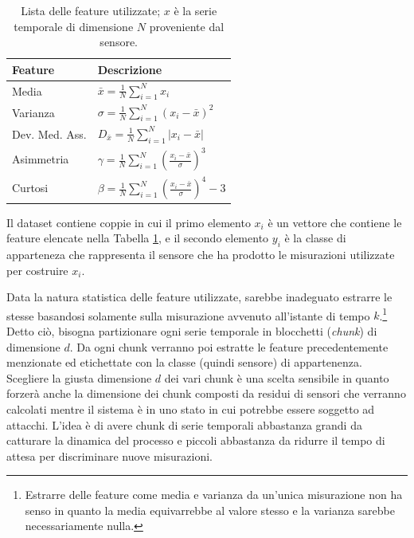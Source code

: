 \documentclass[Lau,binding=0.6cm,noexaminfo]{sapthesis}
\begin{document}
\begin{table}[t]
    \begin{center}
        \begin{tabular}{|l|l|}
        \hline
        \textbf{Feature} & \textbf{Descrizione} \\
        \hline
        Media & $\bar{x} = \frac{1}{N}\sum_{i=1}^N x_i$ \\
        \hline
        Varianza & $\sigma = \frac{1}{N}\sum_{i=1}^N (x_i - \bar{x})^2 $ \\
        \hline
        Dev. Med. Ass. & $D_{\bar{x}} = \frac{1}{N}\sum_{i=1}^N |x_i - \bar{x}|$ \\
        \hline
        Asimmetria & $\gamma = \frac{1}{N} \sum_{i=1}^N (\frac{x_i - \bar{x}}{\sigma})^3 $ \\
        \hline
        Curtosi & $ \beta = \frac{1}{N} \sum_{i=1}^N (\frac{x_i - \bar{x}}{\sigma})^4 - 3$\\
        \hline
        \end{tabular}
    \end{center}
    \caption{Lista delle feature utilizzate; $x$ \`e la serie temporale di dimensione $N$ proveniente dal sensore.}
    \label{tab:1}
\end{table}

Il dataset contiene coppie in cui il primo elemento $x_i$ \`e un vettore che contiene le feature elencate nella Tabella \ref{tab:1}, e il secondo elemento $y_i$ \`e la classe di apparteneza che rappresenta il sensore che ha prodotto le misurazioni utilizzate per costruire $x_i$.

Data la natura statistica delle feature utilizzate, sarebbe inadeguato estrarre le stesse basandosi solamente sulla misurazione avvenuto all'istante di tempo $k$.\footnote{Estrarre delle feature come media e varianza da un'unica misurazione non ha senso in quanto la media equivarrebbe al valore stesso e la varianza sarebbe necessariamente nulla.}
Detto ci\`o, bisogna partizionare ogni serie temporale in blocchetti (\textit{chunk}) di dimensione $d$. 
Da ogni chunk verranno poi estratte le feature precedentemente menzionate ed etichettate con la classe (quindi sensore) di appartenenza.
Scegliere la giusta dimensione $d$ dei vari chunk \`e una scelta sensibile in quanto forzer\`a anche la dimensione dei chunk composti da residui di sensori che verranno calcolati mentre il sistema \`e in uno stato in cui potrebbe essere soggetto ad attacchi.
L'idea \`e di avere chunk di serie temporali abbastanza grandi da catturare la dinamica del processo e piccoli abbastanza da ridurre il tempo di attesa per discriminare nuove misurazioni.
\end{document}
